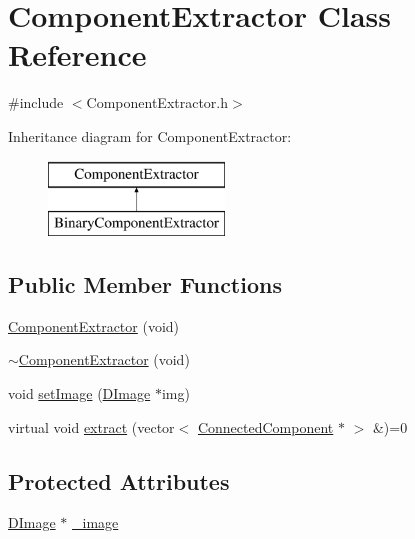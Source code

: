 \hypertarget{class_component_extractor}{\section{Component\+Extractor Class Reference}
\label{class_component_extractor}
}


{\ttfamily \#include $<$Component\+Extractor.\+h$>$}

Inheritance diagram for Component\+Extractor\+:\begin{figure}[H]
\begin{center}
\leavevmode
\includegraphics[height=2.000000cm]{class_component_extractor}
\end{center}
\end{figure}
\subsection*{Public Member Functions}
\begin{DoxyCompactItemize}
\item 
\hyperlink{class_component_extractor_adccc457807e0b48696f94d3c6d28e88f}{Component\+Extractor} (void)
\item 
\hyperlink{class_component_extractor_a4e079014da28395a14fb63babf10e1c6}{$\sim$\+Component\+Extractor} (void)
\item 
void \hyperlink{class_component_extractor_a3ef66896076dc20816fd656b8aeb1f96}{set\+Image} (\hyperlink{class_d_image}{D\+Image} $\ast$img)
\item 
virtual void \hyperlink{class_component_extractor_ac26bd7eec0e6caa7312f603bf2368d84}{extract} (vector$<$ \hyperlink{class_connected_component}{Connected\+Component} $\ast$ $>$ \&)=0
\end{DoxyCompactItemize}
\subsection*{Protected Attributes}
\begin{DoxyCompactItemize}
\item 
\hyperlink{class_d_image}{D\+Image} $\ast$ \hyperlink{class_component_extractor_a57494f356e871fc5216eb13fbdb76f0b}{\+\_\+image}
\end{DoxyCompactItemize}


